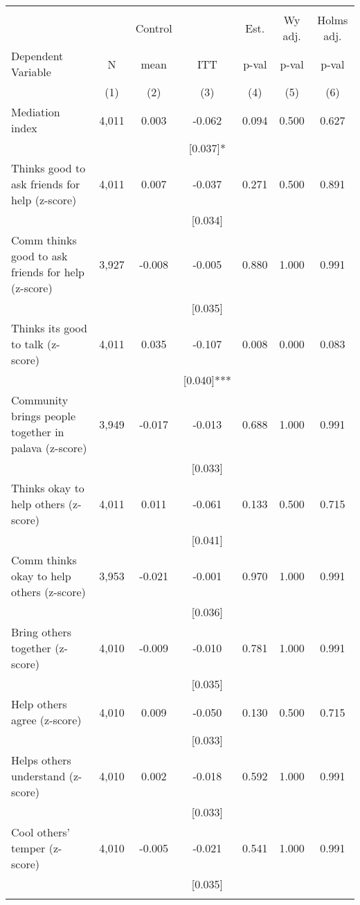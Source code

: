 \begin{tabular}{lcccccc}
\hline \noalign{\smallskip} &  &  &  &  &  & \\
 &  & Control &  & Est. & Wy adj. & Holms adj.\\
Dependent Variable & N & mean & ITT & p-val & p-val & p-val\\
 & (1) & (2) & (3) & (4) & (5) & (6)\\
\noalign{\smallskip}\hline \noalign{\smallskip}Mediation index & 4,011 & 0.003 & -0.062 & 0.094 & 0.500 & 0.627\\
 &  &  & [0.037]* &  &  & \\
\quad Thinks good to ask friends for help (z-score) & 4,011 & 0.007 & -0.037 & 0.271 & 0.500 & 0.891\\
 &  &  & [0.034] &  &  & \\
\quad Comm thinks good to ask friends for help (z-score) & 3,927 & -0.008 & -0.005 & 0.880 & 1.000 & 0.991\\
 &  &  & [0.035] &  &  & \\
\quad Thinks its good to talk (z-score) & 4,011 & 0.035 & -0.107 & 0.008 & 0.000 & 0.083\\
 &  &  & [0.040]*** &  &  & \\
\quad Community brings people together in palava (z-score) & 3,949 & -0.017 & -0.013 & 0.688 & 1.000 & 0.991\\
 &  &  & [0.033] &  &  & \\
\quad Thinks okay to help others (z-score) & 4,011 & 0.011 & -0.061 & 0.133 & 0.500 & 0.715\\
 &  &  & [0.041] &  &  & \\
\quad Comm thinks okay to help others (z-score) & 3,953 & -0.021 & -0.001 & 0.970 & 1.000 & 0.991\\
 &  &  & [0.036] &  &  & \\
\quad Bring others together (z-score) & 4,010 & -0.009 & -0.010 & 0.781 & 1.000 & 0.991\\
 &  &  & [0.035] &  &  & \\
\quad Help others agree (z-score) & 4,010 & 0.009 & -0.050 & 0.130 & 0.500 & 0.715\\
 &  &  & [0.033] &  &  & \\
\quad Helps others understand (z-score) & 4,010 & 0.002 & -0.018 & 0.592 & 1.000 & 0.991\\
 &  &  & [0.033] &  &  & \\
\quad Cool others' temper (z-score) & 4,010 & -0.005 & -0.021 & 0.541 & 1.000 & 0.991\\
 &  &  & [0.035] &  &  & \\
\noalign{\smallskip}\hline\end{tabular}
